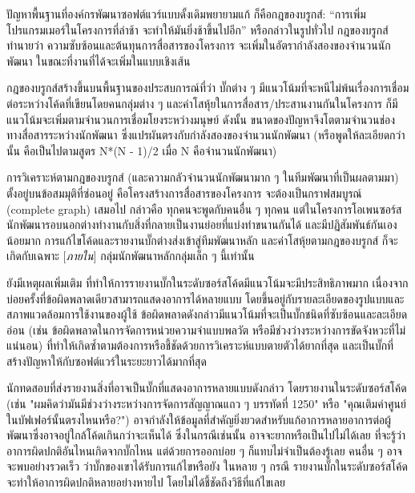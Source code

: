 ปัญหาพื้นฐานที่องค์กรพัฒนาซอฟต์แวร์แบบดั้งเดิมพยายามแก้
ก็คือกฎของบรูกส์: ``การเพิ่มโปรแกรมเมอร์ในโครงการที่ล่าช้า
จะทำให้มันยิ่งช้าขึ้นไปอีก'' หรือกล่าวในรูปทั่วไป กฎของบรูกส์ทำนายว่า
ความซับซ้อนและต้นทุนการสื่อสารของโครงการ
จะเพิ่มในอัตรากำลังสองของจำนวนนักพัฒนา
ในขณะที่งานที่ได้จะเพิ่มในแบบเชิงเส้น

กฎของบรูกส์สร้างขึ้นบนพื้นฐานของประสบการณ์ที่ว่า บั๊กต่าง ๆ
มีแนวโน้มที่จะหนีไม่พ้นเรื่องการเชื่อมต่อระหว่างโค้ดที่เขียนโดยคนกลุ่มต่าง ๆ
และค่าโสหุ้ยในการสื่อสาร/ประสานงานกันในโครงการ
ก็มีแนวโน้มจะเพิ่มตามจำนวนการเชื่อมโยงระหว่างมนุษย์ ดังนั้น
ขนาดของปัญหาจึงโตตามจำนวนช่องทางสื่อสารระหว่างนักพัฒนา
ซึ่งแปรผันตรงกับกำลังสองของจำนวนนักพัฒนา (หรือพูดให้ละเอียดกว่านั้น
คือเป็นไปตามสูตร N*(N - 1)/2 เมื่อ N คือจำนวนนักพัฒนา)

การวิเคราะห์ตามกฎของบรูกส์ (และความกลัวจำนวนนักพัฒนามาก ๆ
ในทีมพัฒนาที่เป็นผลตามมา) ตั้งอยู่บนข้อสมมุติที่ซ่อนอยู่
คือโครงสร้างการสื่อสารของโครงการ จะต้องเป็นกราฟสมบูรณ์ (complete graph)
เสมอไป กล่าวคือ ทุกคนจะพูดกับคนอื่น ๆ  ทุกคน แต่ในโครงการโอเพนซอร์ส
นักพัฒนารอบนอกต่างทำงานกับสิ่งที่กลายเป็นงานย่อยที่แบ่งทำขนานกันได้
และมีปฏิสัมพันธ์กันเองน้อยมาก
การแก้ไขโค้ดและรายงานบั๊กต่างส่งเข้าสู่ทีมพัฒนาหลัก
และค่าโสหุ้ยตามกฎของบรูกส์ ก็จะเกิดกับเฉพาะ {[}\emph{ภายใน}{]}
กลุ่มนักพัฒนาหลักกลุ่มเล็ก ๆ  นี้เท่านั้น 

ยังมีเหตุผลเพิ่มเติม
ที่ทำให้การรายงานบั๊กในระดับซอร์สโค้ดมีแนวโน้มจะมีประสิทธิภาพมาก
เนื่องจากบ่อยครั้งที่ข้อผิดพลาดเดียวสามารถแสดงอาการได้หลายแบบ
โดยขึ้นอยู่กับรายละเอียดของรูปแบบและสภาพแวดล้อมการใช้งานของผู้ใช้
ข้อผิดพลาดดังกล่าวมีแนวโน้มที่จะเป็นบั๊กชนิดที่ซับซ้อนและละเอียดอ่อน
(เช่น ข้อผิดพลาดในการจัดการหน่วยความจำแบบพลวัต
หรือมีช่วงว่างระหว่างการขัดจังหวะที่ไม่แน่นอน)
ที่ทำให้เกิดซ้ำตามต้องการหรือชี้ชัดด้วยการวิเคราะห์แบบตายตัวได้ยากที่สุด
และเป็นบั๊กที่สร้างปัญหาให้กับซอฟต์แวร์ในระยะยาวได้มากที่สุด

นักทดสอบที่ส่งรายงานสิ่งที่อาจเป็นบั๊กที่แสดงอาการหลายแบบดังกล่าว
โดยรายงานในระดับซอร์สโค้ด (เช่น
"ผมคิดว่ามันมีช่วงว่างระหว่างการจัดการสัญญาณแถว ๆ  บรรทัดที่ 1250" หรือ
"คุณเติมค่าศูนย์ในบัฟเฟอร์นั้นตรงไหนหรือ?")
อาจกำลังให้ข้อมูลที่สำคัญยิ่งยวดสำหรับแก้อาการหลายอาการต่อผู้พัฒนาซึ่งอาจอยู่ใกล้โค้ดเกินกว่าจะเห็นได้
ซึ่งในกรณีเช่นนั้น อาจจะยากหรือเป็นไปไม่ได้เลย
ที่จะรู้ว่าอาการผิดปกติอันไหนเกิดจากบั๊กไหน แต่ด้วยการออกบ่อย ๆ
ก็แทบไม่จำเป็นต้องรู้เลย คนอื่น ๆ  อาจจะพบอย่างรวดเร็ว
ว่าบั๊กของเขาได้รับการแก้ไขหรือยัง ในหลาย ๆ  กรณี
รายงานบั๊กในระดับซอร์สโค้ดจะทำให้อาการผิดปกติหลายอย่างหายไป
โดยไม่ได้ชี้ชัดถึงวิธีที่แก้ไขเลย


